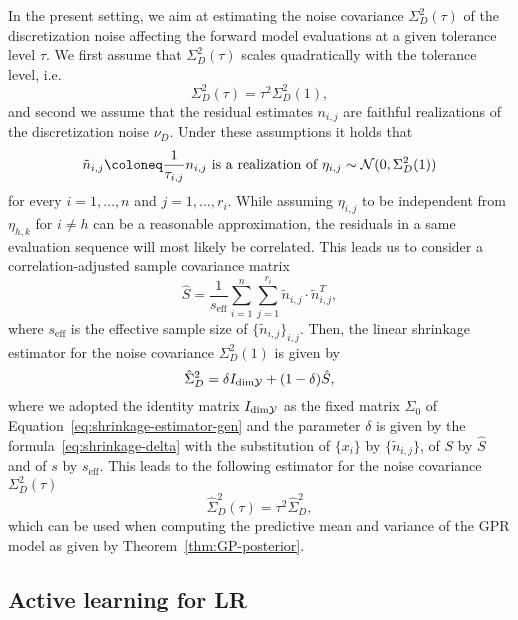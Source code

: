 In the present setting, we aim at estimating the noise covariance $\Sigma^2_D(\tau)$ of the discretization noise affecting the forward model evaluations at a given tolerance level $\tau$.
We first assume that $\Sigma^2_D(\tau)$ scales quadratically with the tolerance level, i.e. 
\[
\Sigma^2_D(\tau) = \tau^2 \Sigma^2_D(1),
\]
and second we assume that the residual estimates $n_{i,j}$ are faithful realizations of the discretization noise $\nu_D$.
Under these assumptions it holds that 
\[
\tilde n_{i,j} \coloneq \frac{1}{\tau_{i,j}} n_{i,j} \text{ is a realization of } \eta_{i,j} \sim \mc N (0, \Sigma^2_D(1))
\]
for every $ i=1,\dots,n $ and $ j=1,\dots,r_i$. \newline
While assuming $\eta_{i,j}$ to be independent from $\eta_{h,k}$ for $i\neq h$ can be a reasonable approximation, the residuals in a same evaluation sequence will most likely be correlated.
This leads us to consider a correlation-adjusted sample covariance matrix  
\begin{equation}
    \hat S = \frac{1}{s_\text{eff}} \sum_{i=1}^n\sum_{j=1}^{r_i} \tilde n_{i,j} \cdot \tilde n_{i,j}^T,
\end{equation} 
where $s_{\text{eff}}$ is the effective sample size of $\{\tilde  n_{i,j}\}_{i,j}$. \newline
Then, the linear shrinkage estimator for the noise covariance $\Sigma^2_D(1)$ is given by
\[
    \hat \Sigma_D^2 = \delta   I_{\text{dim}\mathcal Y} + (1-\delta) \hat S,
\]
where we adopted the identity matrix $I_{\text{dim}\mathcal Y}$ as the fixed matrix $\Sigma_0$ of Equation~\eqref{eq:shrinkage-estimator-gen} and the parameter $\delta$ is given by the formula~\eqref{eq:shrinkage-delta} with the substitution of $\{x_i\}$ by $\{\tilde n_{i,j}\}$, of $S$ by $\hat S$ and of $s$ by $s_{\text{eff}}$.\newline
This leads to the following estimator for the noise covariance $\Sigma^2_D(\tau)$
\begin{equation}\label{eq:shrinkage-estimator}
    \hat{\Sigma}_D^2(\tau) = \tau^2 \hat \Sigma_D^2,
\end{equation}
which can be used when computing the predictive mean and variance of the GPR model as given by Theorem~\ref{thm:GP-posterior}.

\subsection{Active learning for LR}\label{sec:LRAL}

